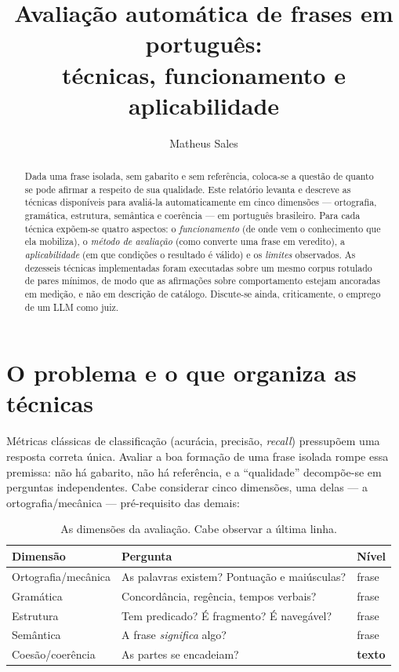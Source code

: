 \documentclass[11pt,a4paper]{article}
\title{Avaliação automática de frases em português:\\
       técnicas, funcionamento e aplicabilidade}
\author{Matheus Sales}
\date{}
\newcommand{\dimtable}[1]{\small #1}
\begin{document}
\maketitle

\begin{abstract}
\noindent
Dada uma frase isolada, sem gabarito e sem referência, coloca-se a questão de quanto se pode afirmar
a respeito de sua qualidade. Este relatório levanta e descreve as técnicas disponíveis para avaliá-la
automaticamente em cinco dimensões --- ortografia, gramática, estrutura, semântica e coerência ---
em português brasileiro. Para cada técnica expõem-se quatro aspectos: o \emph{funcionamento} (de
onde vem o conhecimento que ela mobiliza), o \emph{método de avaliação} (como converte uma frase em
veredito), a \emph{aplicabilidade} (em que condições o resultado é válido) e os \emph{limites}
observados. As dezesseis técnicas implementadas foram executadas sobre um mesmo corpus rotulado de
pares mínimos, de modo que as afirmações sobre comportamento estejam ancoradas em medição, e não em
descrição de catálogo. Discute-se ainda, criticamente, o emprego de um LLM como juiz.
\end{abstract}

\section{O problema e o que organiza as técnicas}

Métricas clássicas de classificação (acurácia, precisão, \textit{recall}) pressupõem uma resposta
correta única. Avaliar a boa formação de uma frase isolada rompe essa premissa: não há gabarito,
não há referência, e a ``qualidade'' decompõe-se em perguntas independentes. Cabe considerar cinco
dimensões, uma delas --- a ortografia/mecânica --- pré-requisito das demais:

\begin{table}[H]
\centering
\dimtable{
\begin{tabular}{@{}lll@{}}
\toprule
\textbf{Dimensão} & \textbf{Pergunta} & \textbf{Nível} \\
\midrule
Ortografia/mecânica & As palavras existem? Pontuação e maiúsculas? & frase \\
Gramática           & Concordância, regência, tempos verbais?      & frase \\
Estrutura           & Tem predicado? É fragmento? É navegável?      & frase \\
Semântica           & A frase \textit{significa} algo?              & frase \\
Coesão/coerência    & As partes se encadeiam?                       & \textbf{texto} \\
\bottomrule
\end{tabular}}
\caption{As dimensões da avaliação. Cabe observar a última linha.}
\label{tab:dimensoes}
\end{table}
\end{document}
